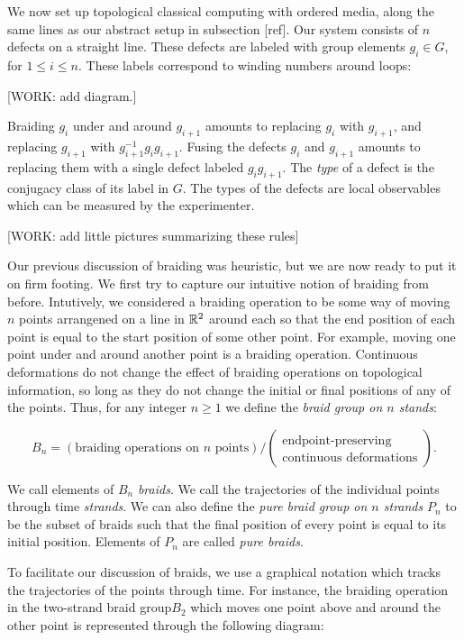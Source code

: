We now set up topological classical computing with ordered media, along the same lines as our abstract setup in subsection [ref]. Our system consists of $n$ defects on a straight line. These defects are labeled with group elements $g_i\in G$, for $1\leq i \leq n$. These labels correspond to winding numbers around loops:

[WORK: add diagram.]

Braiding $g_i$ under and around $g_{i+1}$ amounts to replacing $g_i$ with $g_{i+1}$, and replacing $g_{i+1}$ with $g_{i+1}^{-1}g_i g_{i+1}$. Fusing the defects $g_{i}$ and $g_{i+1}$ amounts to replacing them with a single defect labeled $g_{i}g_{i+1}$. The \textit{type} of a defect is the conjugacy class of its label in $G$. The types of the defects are local observables which can be measured by the experimenter.

[WORK: add little pictures summarizing these rules]

Our previous discussion of braiding was heuristic, but we are now ready to put it on firm footing. We first try to capture our intuitive notion of braiding from before. Intutively, we considered a braiding operation to be some way of moving $n$ points arrangened on a line in $\mathbb{R}^2$ around each so that the end position of each point is equal to the start position of some other point. For example, moving one point under and around another point is a braiding operation. Continuous deformations do not change the effect of braiding operations on topological information, so long as they do not change the initial or final positions of any of the points. Thus, for any integer $n\geq 1$ we define the \textit{braid group on $n$ stands}:

$$B_n=(\text{braiding operations on $n$ points})/(\substack{\text{endpoint-preserving} \\ \text{continuous deformations}}).$$

We call elements of $B_n$ \textit{braids}. We call the trajectories of the individual points through time \textit{strands}. We can also define the \textit{pure braid group on $n$ strands} $P_n$ to be the subset of braids such that the final position of every point is equal to its initial position. Elements of $P_n$ are called \textit{pure braids}.

To facilitate our discussion of braids, we use a graphical notation which tracks the trajectories of the points through time. For instance, the braiding operation in the two-strand braid group$B_2$ which moves one point above and around the other point is represented through the following diagram:

